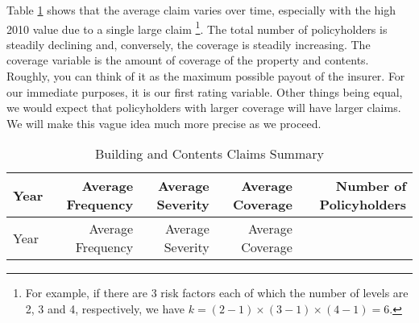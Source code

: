\documentclass[]{book}
\let\rmarkdownfootnote\footnote%
\def\footnote{\protect\rmarkdownfootnote}
\theoremstyle{definition}
\theoremstyle{definition}
\theoremstyle{definition}
\theoremstyle{remark}
\begin{document}
Table \ref{tab:CoverageBCIM} shows that the average claim varies over
time, especially with the high 2010 value due to a single large claim
\footnote{For example, if there are 3 risk factors each of which the
  number of levels are 2, 3 and 4, respectively, we have
  \(k=(2-1)\times(3-1)\times (4-1)=6\).}. The total number of
policyholders is steadily declining and, conversely, the coverage is
steadily increasing. The coverage variable is the amount of coverage of
the property and contents. Roughly, you can think of it as the maximum
possible payout of the insurer. For our immediate purposes, it is our
first rating variable. Other things being equal, we would expect that
policyholders with larger coverage will have larger claims. We will make
this vague idea much more precise as we proceed.

\begin{longtable}[]{@{}lrrrr@{}}
\caption{\label{tab:CoverageBCIM} Building and Contents Claims
Summary}\tabularnewline
\toprule
\begin{minipage}[b]{0.17\columnwidth}\raggedright\strut
Year\strut
\end{minipage} & \begin{minipage}[b]{0.14\columnwidth}\raggedleft\strut
Average Frequency\strut
\end{minipage} & \begin{minipage}[b]{0.17\columnwidth}\raggedleft\strut
Average Severity\strut
\end{minipage} & \begin{minipage}[b]{0.16\columnwidth}\raggedleft\strut
Average Coverage\strut
\end{minipage} & \begin{minipage}[b]{0.16\columnwidth}\raggedleft\strut
Number of Policyholders\strut
\end{minipage}\tabularnewline
\midrule
\endfirsthead
\toprule
\begin{minipage}[b]{0.17\columnwidth}\raggedright\strut
Year\strut
\end{minipage} & \begin{minipage}[b]{0.14\columnwidth}\raggedleft\strut
Average Frequency\strut
\end{minipage} & \begin{minipage}[b]{0.17\columnwidth}\raggedleft\strut
Average Severity\strut
\end{minipage} & \begin{minipage}[b]{0.16\columnwidth}\raggedleft\strut
Average Coverage\strut
\end{minipage} & \begin{minipage}[b]{0.16\columnwidth}\raggedleft\strut

\end{minipage}
\end{longtable}
\end{document}
